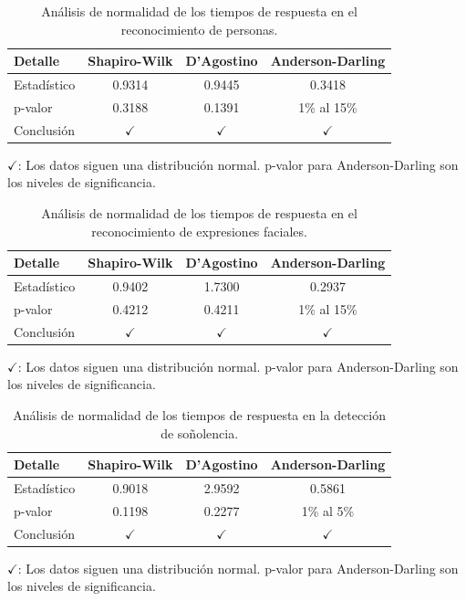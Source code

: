 \begin{table}[h]
\centering
\caption{Análisis de normalidad de los tiempos de respuesta en el reconocimiento de personas.}
\label{table:PersonsNormality}
\begin{tabularx}{0.6\textwidth}{Xccc}
	\toprule
	\textbf{Detalle} & \textbf{Shapiro-Wilk} & \textbf{D'Agostino} & \textbf{Anderson-Darling}\\
	\midrule
	Estadístico & 0.9314 & 0.9445 &  0.3418 \\
	p-valor & 0.3188 & 0.1391 & 1\% al 15\% \\
	Conclusión & \(\checkmark\) & \(\checkmark\) & \(\checkmark\)\\
\end{tabularx}
\vspace{0.3em} %
\parbox{0.75\textwidth}{\footnotesize
	\(\checkmark\): Los datos siguen una distribución normal. p-valor para Anderson-Darling son los niveles de significancia.
}
\end{table}

\begin{table}[h]
\centering
\caption{Análisis de normalidad de los tiempos de respuesta en el reconocimiento de expresiones faciales.}
\label{FaceExpressionsNormality}
\begin{tabularx}{0.6\textwidth}{Xccc}
	\toprule
	\textbf{Detalle} & \textbf{Shapiro-Wilk} & \textbf{D'Agostino} & \textbf{Anderson-Darling}\\
	\midrule
	Estadístico & 0.9402 & 1.7300 &  0.2937 \\
	p-valor & 0.4212 & 0.4211 & 1\% al 15\% \\
	Conclusión & \(\checkmark\) & \(\checkmark\) & \(\checkmark\)\\
\end{tabularx}
\vspace{0.3em} %
\parbox{0.75\textwidth}{\footnotesize
	\(\checkmark\): Los datos siguen una distribución normal. p-valor para Anderson-Darling son los niveles de significancia.
}
\end{table}

\begin{table}[h]
\centering
\caption{Análisis de normalidad de los tiempos de respuesta en la detección de soñolencia.}
\label{SleepingNormality}
\begin{tabularx}{0.6\textwidth}{Xccc}
	\toprule
	\textbf{Detalle} & \textbf{Shapiro-Wilk} & \textbf{D'Agostino} & \textbf{Anderson-Darling}\\
	\midrule
	Estadístico & 0.9018 & 2.9592 &  0.5861 \\
	p-valor & 0.1198 & 0.2277 & 1\% al 5\% \\
	Conclusión & \(\checkmark\) & \(\checkmark\) & \(\checkmark\)\\
\end{tabularx}
\vspace{0.3em} %
\parbox{0.75\textwidth}{\footnotesize
	\(\checkmark\): Los datos siguen una distribución normal. p-valor para Anderson-Darling son los niveles de significancia.
}
\end{table}

